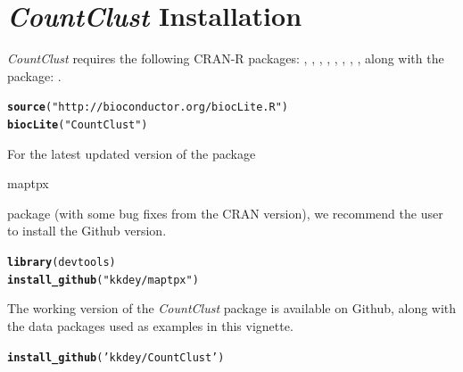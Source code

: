 \documentclass[12pt]{article}\usepackage[]{graphicx}\usepackage[usenames,dvipsnames]{color}
\makeatletter
\newcommand{\hlstr}[1]{\textcolor[rgb]{0.192,0.494,0.8}{#1}}%
\newcommand{\hlstd}[1]{\textcolor[rgb]{0.345,0.345,0.345}{#1}}%
\newcommand{\hlkwd}[1]{\textcolor[rgb]{0.737,0.353,0.396}{\textbf{#1}}}%
\newenvironment{kframe}{%
 \def\at@end@of@kframe{}%
 \ifinner\ifhmode%
  \def\at@end@of@kframe{\end{minipage}}%
  \begin{minipage}{\columnwidth}%
 \fi\fi%
 \def\FrameCommand##1{\hskip\@totalleftmargin \hskip-\fboxsep
 \colorbox{shadecolor}{##1}\hskip-\fboxsep
     \hskip-\linewidth \hskip-\@totalleftmargin \hskip\columnwidth}%
 \MakeFramed {\advance\hsize-\width
   \@totalleftmargin\z@ \linewidth\hsize
   \@setminipage}}%
 {\par\unskip\endMakeFramed%
 \at@end@of@kframe}
\newenvironment{knitrout}{}{} %
\newcommand{\CountClust}{\textit{CountClust}}
\makeatother
\begin{document}
\section{\CountClust{} Installation}

\CountClust{} requires the following CRAN-R packages: , , , , , , , ,  along with the \Bioconductor{} package: .

\begin{knitrout}
\color{fgcolor}\begin{kframe}
\begin{alltt}
\hlkwd{source}\hlstd{(}\hlstr{"http://bioconductor.org/biocLite.R"}\hlstd{)}
\hlkwd{biocLite}\hlstd{(}\hlstr{"CountClust"}\hlstd{)}
\end{alltt}
\end{kframe}
\end{knitrout}

For the latest updated version of the package \begin{verb} maptpx \end{verb} package (with some bug fixes from the CRAN version), we recommend the user to install the Github version.

\begin{knitrout}
\color{fgcolor}\begin{kframe}
\begin{alltt}
\hlkwd{library}\hlstd{(devtools)}
\hlkwd{install_github}\hlstd{(}\hlstr{"kkdey/maptpx"}\hlstd{)}
\end{alltt}
\end{kframe}
\end{knitrout}

The working version of the \CountClust{} package is available on Github, along with the data packages used as examples in this vignette.

\begin{knitrout}
\color{fgcolor}\begin{kframe}
\begin{alltt}
\hlkwd{install_github}\hlstd{(}\hlstr{'kkdey/CountClust'}\hlstd{)}
\end{alltt}
\end{kframe}
\end{knitrout}
\end{document}
